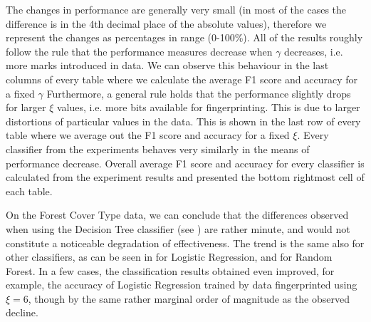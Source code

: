 The changes in performance are generally very small (in most of the cases the difference is in the 4th decimal place of the absolute values), therefore we represent the changes as percentages in range (0-100\%). 
All of the results roughly follow the rule that the performance measures decrease when $\gamma$ decreases, i.e. more marks introduced in data. We can observe this behaviour in the last columns of every table where we calculate the average F1 score and accuracy for a fixed $\gamma$ 
Furthermore, a general rule holds that the performance slightly drops for larger $\xi$ values, i.e. more bits available for fingerprinting. This is due to larger distortions of particular values in the data.
This is shown in the last row of every table where we average out the F1 score and accuracy for a fixed $\xi$.
Every classifier from the experiments behaves very similarly in the means of performance decrease. Overall average F1 score and accuracy for every classifier is calculated from the experiment results and presented the bottom rightmost cell of each table. 

On the Forest Cover Type data, we can conclude that the differences observed when using the Decision Tree classifier (see ) are rather minute, and would not constitute a noticeable degradation of effectiveness. 
The trend is the same also for other classifiers, as can be seen in  for Logistic Regression, and  for Random Forest.
In a few cases, the classification results obtained even improved, for example, the accuracy of Logistic Regression trained by data fingerprinted using $\xi=6$, though by the same rather marginal order of magnitude as the observed decline. 

